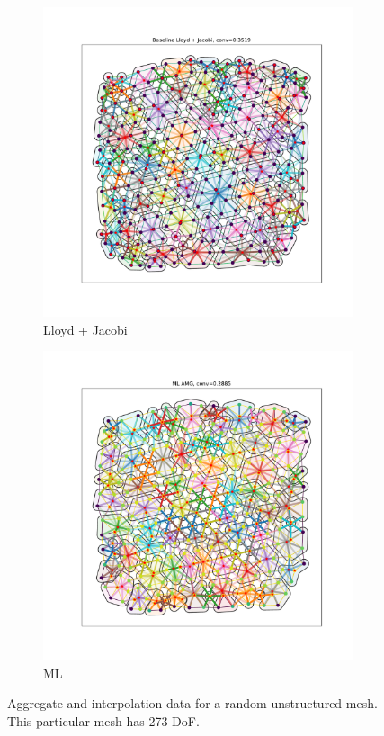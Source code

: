 \documentclass{article}
\begin{document}
\begin{figure}[h]
  \centering
  \begin{subfigure}[t]{0.49\textwidth}
    \centering
    \includegraphics[width=\textwidth]{grid_800_lloyd.pdf}
    \caption{Lloyd + Jacobi}
  \end{subfigure}
  \begin{subfigure}[t]{0.49\textwidth}
    \centering
    \includegraphics[width=\textwidth]{grid_800_ml.pdf}
    \caption{ML}
  \end{subfigure}
  \caption{Aggregate and interpolation data for a random unstructured mesh.  This particular mesh has 273 DoF.}
  \label{fig:grid800}
\end{figure}
\end{document}
